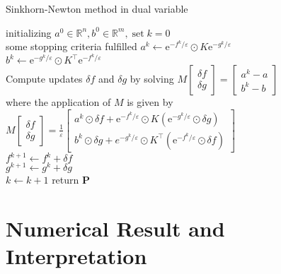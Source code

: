 \documentclass{article}
\begin{document}
\begin{algorithm}[H]
  \SetAlgoNoLine
  \caption{Sinkhorn-Newton method in dual variable} 
  initializing $a ^ { 0 } \in \mathbb { R } ^ { n } , b ^ { 0 } \in \mathbb { R } ^ { m } , \operatorname { set } k = 0$\\
  \Repeat
  { some stopping criteria fulfilled }{
 $a ^ { k }\gets  \mathrm { e } ^ { - f ^ { k } / \varepsilon } \odot K \mathrm { e } ^ { - g ^ { k } / \varepsilon }$\\
 $b ^ { k } \gets  \mathrm { e } ^ { - g ^ { k } / \varepsilon } \odot K ^ { \top } \mathrm { e } ^ { - f ^ { k } / \varepsilon }$\\
 Compute updates $\delta f$ and $\delta g$ by solving
$M \left[ \begin{array} { c } { \delta f } \\ { \delta g } \end{array} \right] = \left[ \begin{array} { c } { a ^ { k } - a } \\ { b ^ { k } - b } \end{array} \right]$\\
   where the application of $M$ is given by
$M \left[ \begin{array} { c } { \delta f } \\ { \delta g } \end{array} \right] = \frac { 1 } { \varepsilon } \left[ \begin{array} { c } { a ^ { k } \odot \delta f + \mathrm { e } ^ { - f ^ { k } / \varepsilon } \odot K \left( \mathrm { e } ^ { - g ^ { k } / \varepsilon } \odot \delta g \right) } \\ { b ^ { k } \odot \delta g + e ^ { - g ^ { k } / \varepsilon } \odot K ^ { \top } \left( \mathrm { e } ^ { - f ^ { k } / \varepsilon } \odot \delta f \right) } \end{array} \right]$\\
$f ^ { k + 1 } \gets f ^ { k } + \delta f$\\
$g ^ { k + 1 } \gets  g ^ { k } + \delta g$\\
$k\gets k+1$
  }
  return $\mathbf{P}$
\end{algorithm}


\section{Numerical Result and Interpretation}
\end{document}
